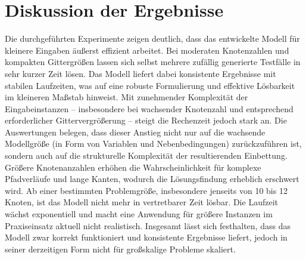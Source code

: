 \documentclass[bachelor, german]{algothesis}
\begin{document}
\section{Diskussion der Ergebnisse}
Die durchgeführten Experimente zeigen deutlich, dass das entwickelte Modell für kleinere Eingaben äußerst effizient arbeitet. Bei moderaten Knotenzahlen und kompakten Gittergrößen lassen sich selbst mehrere zufällig generierte Testfälle in sehr kurzer Zeit lösen. Das Modell liefert dabei konsistente Ergebnisse mit stabilen Laufzeiten, was auf eine robuste Formulierung und effektive Lösbarkeit im kleineren Maßstab hinweist.\newline 
Mit zunehmender Komplexität der Eingabeinstanzen – insbesondere bei wachsender Knotenzahl und entsprechend erforderlicher Gittervergrößerung – steigt die Rechenzeit jedoch stark an. Die Auswertungen belegen, dass dieser Anstieg nicht nur auf die wachsende Modellgröße (in Form von Variablen und Nebenbedingungen) zurückzuführen ist, sondern auch auf die strukturelle Komplexität der resultierenden Einbettung. Größere Knotenanzahlen erhöhen die Wahrscheinlichkeit für komplexe Pfadverläufe und lange Kanten, wodurch die Lösungsfindung erheblich erschwert wird.\newline 
Ab einer bestimmten Problemgröße, insbesondere jenseits von 10 bis 12 Knoten, ist das Modell nicht mehr in vertretbarer Zeit lösbar. Die Laufzeit wächst exponentiell und macht eine Anwendung für größere Instanzen im Praxiseinsatz aktuell nicht realistisch. Insgesamt lässt sich festhalten, dass das Modell zwar korrekt funktioniert und konsistente Ergebnisse liefert, jedoch in seiner derzeitigen Form nicht für großskalige Probleme skaliert.
\end{document}

